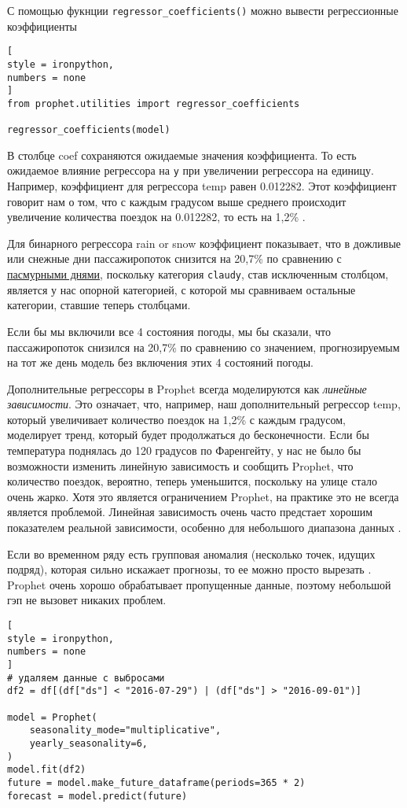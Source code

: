 \documentclass[%
	11pt,
	a4paper,
	utf8,
		]{article}
\begin{document}
С помощью фукнции \verb|regressor_coefficients()| можно вывести регрессионные коэффициенты
\begin{lstlisting}[
style = ironpython,
numbers = none	
]
from prophet.utilities import regressor_coefficients

regressor_coefficients(model)
\end{lstlisting}

В столбце coef сохраняются ожидаемые значения коэффициента. То есть ожидаемое влияние регрессора на \verb|y| при увеличении регрессора на единицу. Например, коэффициент для регрессора temp равен 0.012282. Этот коэффициент говорит нам о том, что с каждым градусом выше среднего происходит увеличение количества поездок на 0.012282, то есть на 1,2\% \cite[]{gruzdev:time-series-2022}.

Для бинарного регрессора rain or snow коэффициент показывает, что в дожливые или снежные дни пассажиропоток снизится на 20,7\% по сравнению с \underline{пасмурными днями}, поскольку категория \verb|claudy|, став исключенным столбцом, является у нас опорной категорией, с которой мы сравниваем остальные категории, ставшие теперь столбцами.

Если бы мы включили все 4 состояния погоды, мы бы сказали, что пассажиропоток снизился на 20,7\% по сравнению со значением, прогнозируемым на тот же день модель без включения этих 4 состояний погоды.

Дополнительные регрессоры в Prophet всегда моделируются как \emph{линейные зависимости}. Это означает, что, например, наш дополнительный регрессор temp, который увеличивает количество поездок на 1,2\% с каждым градусом, моделирует тренд, который будет продолжаться до бесконечности. Если бы температура поднялась до 120 градусов по Фаренгейту, у нас не было бы возможности изменить линейную зависимость и сообщить Prophet, что количество поездок, вероятно, теперь уменьшится, поскольку на улице стало очень жарко. Хотя это является ограничением Prophet, на практике это не всегда является проблемой. Линейная зависимость очень часто предстает хорошим показателем реальной зависимости, особенно для небольшого диапазона данных \cite[]{gruzdev:time-series-2022}.

Если во временном ряду есть групповая аномалия (несколько точек, идущих подряд), которая сильно искажает прогнозы, то ее можно просто вырезать \cite[]{gruzdev:time-series-2022}. Prophet очень хорошо обрабатывает пропущенные данные, поэтому небольшой гэп не вызовет никаких проблем.
\begin{lstlisting}[
style = ironpython,
numbers = none
]
# удаляем данные с выбросами
df2 = df[(df["ds"] < "2016-07-29") | (df["ds"] > "2016-09-01")]

model = Prophet(
    seasonality_mode="multiplicative",
    yearly_seasonality=6,
)
model.fit(df2)
future = model.make_future_dataframe(periods=365 * 2)
forecast = model.predict(future)
\end{lstlisting}
\end{document}
